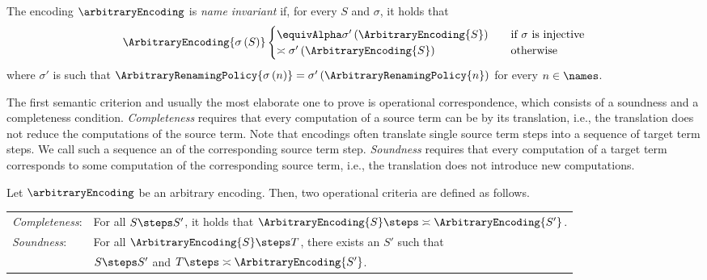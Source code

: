 \documentclass[]{llncs}
\begin{document}
\begin{definition}
\label{def:nameInvariance}
	The encoding $ \arbitraryEncoding $ is \emph{name invariant} if, for every $ S $ and $ \sigma $, it holds that
	\begin{align*}
		\ArbitraryEncoding{\sigma\left( S \right)} \begin{cases} \equivAlpha \sigma'\left( \ArbitraryEncoding{S} \right) & \quad \text{if } \sigma \text{ is injective}\\ \asymp \sigma'\left( \ArbitraryEncoding{S} \right) & \quad \text{otherwise} \end{cases}
	\end{align*}
	where $ \sigma' $ is such that $ \ArbitraryRenamingPolicy{\sigma\left( n \right)} = \sigma'\left( \ArbitraryRenamingPolicy{n} \right) $ for every $ n \in \names $.
\end{definition}

The first semantic criterion and usually the most elaborate one to prove is operational correspondence, which consists of a soundness and a completeness condition. \emph{Completeness} requires that every computation of a source term can be \simulated by its translation, i.e., the translation does not reduce the computations of the source term. Note that encodings often translate single source term steps into a sequence of target term steps. We call such a sequence an \emph{\simulation}\!\! of the corresponding source term step. \emph{Soundness} requires that every computation of a target term corresponds to some computation of the corresponding source term, i.e., the translation does not introduce new computations.

\begin{definition}
\label{def:operationalCorrespondence}
	Let $ \arbitraryEncoding $ be an arbitrary encoding.  Then, two operational criteria are defined as follows. 
        \begin{center}
          \begin{tabular}{ll}
            \emph{Completeness}: & For all $ S \steps S' $, it holds that $ \ArbitraryEncoding{S} \steps \asymp \ArbitraryEncoding{S'} $.\\
            \emph{Soundness}: & For all $ \ArbitraryEncoding{S} \steps T $, there exists an $ S' $ such that\\
            & $ S \steps S' $ and $ T \steps \asymp \ArbitraryEncoding{S'} $.
          \end{tabular}
        \end{center}
\end{definition}
\end{document}
